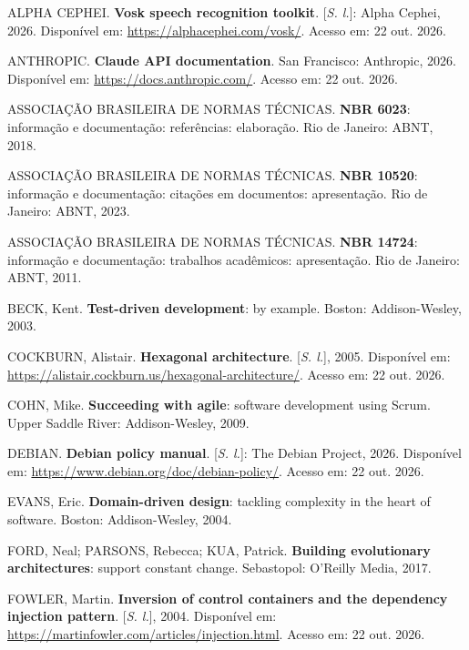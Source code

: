 
\begingroup
\singlespacing
\setlength{\parindent}{0pt}
\setlength{\parskip}{12pt}
\raggedright

ALPHA CEPHEI. \textbf{Vosk speech recognition toolkit}. [\textit{S. l.}]: Alpha Cephei, 2026.
Disponível em: \url{https://alphacephei.com/vosk/}. Acesso em: 22 out. 2026.

ANTHROPIC. \textbf{Claude API documentation}. San Francisco: Anthropic, 2026. Disponível em:
\url{https://docs.anthropic.com/}. Acesso em: 22 out. 2026.

ASSOCIAÇÃO BRASILEIRA DE NORMAS TÉCNICAS. \textbf{NBR 6023}: informação e documentação: referências:
elaboração. Rio de Janeiro: ABNT, 2018.

ASSOCIAÇÃO BRASILEIRA DE NORMAS TÉCNICAS. \textbf{NBR 10520}: informação e documentação: citações em
documentos: apresentação. Rio de Janeiro: ABNT, 2023.

ASSOCIAÇÃO BRASILEIRA DE NORMAS TÉCNICAS. \textbf{NBR 14724}: informação e documentação: trabalhos
acadêmicos: apresentação. Rio de Janeiro: ABNT, 2011.

BECK, Kent. \textbf{Test-driven development}: by example. Boston: Addison-Wesley, 2003.

COCKBURN, Alistair. \textbf{Hexagonal architecture}. [\textit{S. l.}], 2005. Disponível em:
\url{https://alistair.cockburn.us/hexagonal-architecture/}. Acesso em: 22 out. 2026.

COHN, Mike. \textbf{Succeeding with agile}: software development using Scrum. Upper Saddle River:
Addison-Wesley, 2009.

DEBIAN. \textbf{Debian policy manual}. [\textit{S. l.}]: The Debian Project, 2026. Disponível em:
\url{https://www.debian.org/doc/debian-policy/}. Acesso em: 22 out. 2026.

EVANS, Eric. \textbf{Domain-driven design}: tackling complexity in the heart of software. Boston:
Addison-Wesley, 2004.

FORD, Neal; PARSONS, Rebecca; KUA, Patrick. \textbf{Building evolutionary architectures}: support
constant change. Sebastopol: O'Reilly Media, 2017.

FOWLER, Martin. \textbf{Inversion of control containers and the dependency injection pattern}.
[\textit{S. l.}], 2004. Disponível em: \url{https://martinfowler.com/articles/injection.html}. Acesso
em: 22 out. 2026.

